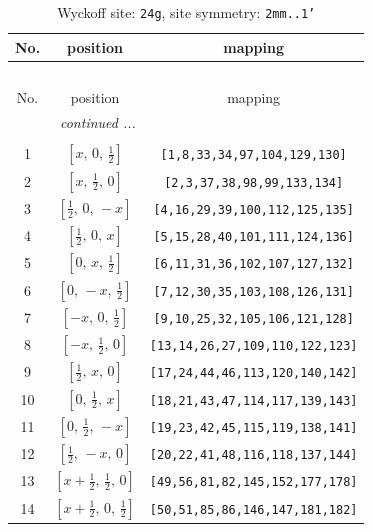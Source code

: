 \documentclass[fleqn,8pt]{jsarticle}
\begin{document}
\begin{longtable}{ccc}
\caption{Wyckoff site: {\tt 24g}, site symmetry: {\tt 2mm..1'}}
 \\
 \hline \hline
No. & position & mapping \\ \hline \endfirsthead

\multicolumn{2}{l}{\tablename\ \thetable{}} \\
 \hline \hline
No. & position & mapping \\ \hline \endhead

 \hline \hline
\multicolumn{2}{r}{\footnotesize\it continued ...} \\ \endfoot

 \hline \hline
\multicolumn{2}{r}{} \\ \endlastfoot

1 & $\left[ x,\, 0,\, \frac{1}{2} \right]$ & {\tt [1,8,33,34,97,104,129,130]} \\ \hline
2 & $\left[ x,\, \frac{1}{2},\, 0 \right]$ & {\tt [2,3,37,38,98,99,133,134]} \\ \hline
3 & $\left[ \frac{1}{2},\, 0,\, - x \right]$ & {\tt [4,16,29,39,100,112,125,135]} \\ \hline
4 & $\left[ \frac{1}{2},\, 0,\, x \right]$ & {\tt [5,15,28,40,101,111,124,136]} \\ \hline
5 & $\left[ 0,\, x,\, \frac{1}{2} \right]$ & {\tt [6,11,31,36,102,107,127,132]} \\ \hline
6 & $\left[ 0,\, - x,\, \frac{1}{2} \right]$ & {\tt [7,12,30,35,103,108,126,131]} \\ \hline
7 & $\left[ - x,\, 0,\, \frac{1}{2} \right]$ & {\tt [9,10,25,32,105,106,121,128]} \\ \hline
8 & $\left[ - x,\, \frac{1}{2},\, 0 \right]$ & {\tt [13,14,26,27,109,110,122,123]} \\ \hline
9 & $\left[ \frac{1}{2},\, x,\, 0 \right]$ & {\tt [17,24,44,46,113,120,140,142]} \\ \hline
10 & $\left[ 0,\, \frac{1}{2},\, x \right]$ & {\tt [18,21,43,47,114,117,139,143]} \\ \hline
11 & $\left[ 0,\, \frac{1}{2},\, - x \right]$ & {\tt [19,23,42,45,115,119,138,141]} \\ \hline
12 & $\left[ \frac{1}{2},\, - x,\, 0 \right]$ & {\tt [20,22,41,48,116,118,137,144]} \\ \hline
13 & $\left[ x + \frac{1}{2},\, \frac{1}{2},\, 0 \right]$ & {\tt [49,56,81,82,145,152,177,178]} \\ \hline
14 & $\left[ x + \frac{1}{2},\, 0,\, \frac{1}{2} \right]$ & {\tt [50,51,85,86,146,147,181,182]} \\ \hline

\end{longtable}
\end{document}
